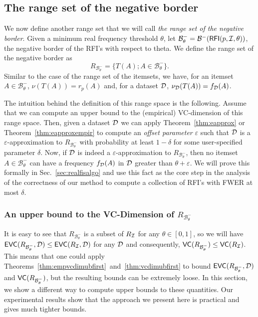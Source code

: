 \subsection{The range set of the negative border}\label{sec:rangenegbord}
We now define another range set that we will call \emph{the range set of the
negative border}. Given a minimum real frequency
threshold $\theta$, let
$\mathcal{B}^-_\theta=\mathcal{B}^-(\mathsf{RFI}(p,{\cal I},\theta))$, the negative border
of the RFI's with respect to theta. We define the range set of the negative
border as
\[R_{\mathcal{B}^-_\theta}=\{T(A); A\in\mathcal{B}^-_\theta\}.\] 
Similar to the case of the range set of the itemsets, we have, for an itemset
$A\in\mathcal{B}^-_\theta$, $\nu(T(A))=r_p(A)$ and, for a dataset ${\cal D}$,
$\nu_{\cal D}(T(A))=f_{\cal D}(A)$.

The intuition behind the definition of this range space is the following.
Assume that we can compute an upper bound to the (empirical) VC-dimension of
this range space. Then, given a dataset ${\cal D}$ we can apply Theorem~\ref{thm:eapprox}
or Theorem~\ref{thm:eapproxempir} to compute an \emph{offset
parameter} $\varepsilon$ such that ${\cal D}$ is a $\varepsilon$-approximation to
$R_{\mathcal{B}^-_\theta}$ with probability at least $1-\delta$ for some
user-specified parameter $\delta$. Now, if ${\cal D}$ is indeed a
$\varepsilon$-approximation to $R_{\mathcal{B}^-_\theta}$, then no itemset
$A\in\mathcal{B}^-_\theta$ can have a frequency $f_{\cal D}(A)$ in ${\cal D}$ greater than
$\theta+\varepsilon$. We will prove this formally in Sec.~\ref{sec:realfisalgo} and
use this fact as the core step in the analysis of the correctness of our method
to compute a collection of RFI's with FWER at most $\delta$.

\subsubsection{An upper bound to the VC-Dimension of
$R_{\mathcal{B}^-_\theta}$}\label{sec:bindexub}
It is easy to see that $R_{\mathcal{B}^-_\theta}$ is a subset of $R_{\cal I}$ for
any $\theta\in[0,1]$, so we will have
$\mathsf{EVC}(R_{\mathcal{B}^-_\theta},{\cal D})\le\mathsf{EVC}(R_{\cal I},{\cal D})$ for any ${\cal D}$ and
consequently, $\mathsf{VC}(R_{\mathcal{B}^-_\theta})\le\mathsf{VC}(R_{\cal I})$. This means that one
could apply Theorems~\ref{thm:empvcdimubfirst}~and~\ref{thm:vcdimubfirst} to
bound $\mathsf{EVC}(R_{\mathcal{B}^-_\theta},{\cal D})$ and $\mathsf{VC}(R_{\mathcal{B}^-_\theta})$,
but the resulting bounds can be extremely loose. In this section, we show a
different way to compute upper bounds to these quantities. Our experimental
results show that the approach we present here is practical and gives much
tighter bounds.

